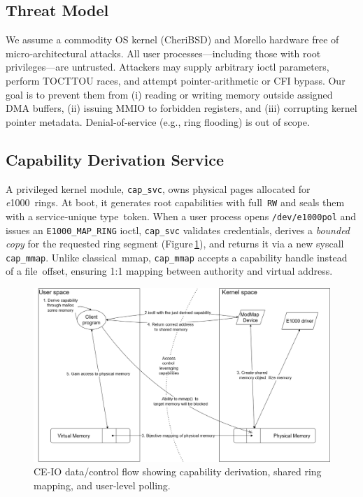 \documentclass[sigconf]{acmart}
\newcommand{\e}{\textit{e}1000\xspace}
\begin{document}
\subsection{Threat Model}
We assume a commodity OS kernel (CheriBSD) and Morello hardware free of micro‑architectural attacks. All user processes—including those with root privileges—are untrusted. Attackers may supply arbitrary ioctl parameters, perform TOCTTOU races, and attempt pointer‑arithmetic or CFI bypass. Our goal is to prevent them from (i) reading or writing memory outside assigned DMA buffers, (ii) issuing MMIO to forbidden registers, and (iii) corrupting kernel pointer metadata. Denial‑of‑service (e.g., ring flooding) is out of scope.

\subsection{Capability Derivation Service}
A privileged kernel module, \texttt{cap\_svc}, owns physical pages allocated for \e rings. At boot, it generates root capabilities with full \texttt{RW} and seals them with a service‑unique type token. When a user process opens \texttt{/dev/e1000pol} and issues an \texttt{E1000\_MAP\_RING} ioctl, \texttt{cap\_svc} validates credentials, derives a \emph{bounded copy} for the requested ring segment (Figure\,\ref{fig:flow}), and returns it via a new syscall \texttt{cap\_mmap}. Unlike classical mmap, \texttt{cap\_mmap} accepts a capability handle instead of a file offset, ensuring 1:1 mapping between authority and virtual address.  

\begin{figure}[t]
    \centering
    \includegraphics[width=0.9\columnwidth]{figures/general flowpng.png}
    \caption{CE-IO data/control flow showing capability derivation, shared ring mapping, and user‑level polling.}
    \label{fig:flow}
\end{figure}
\end{document}
